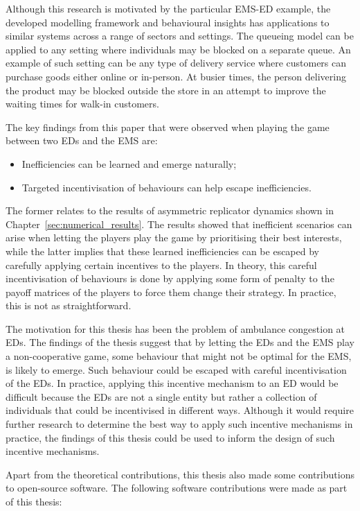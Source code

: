 Although this research is motivated by the particular EMS-ED example, the
developed modelling framework and behavioural insights has applications to
similar systems across a range of sectors and settings.
The queueing model can be applied to any setting where individuals may be
blocked on a separate queue.
An example of such setting can be any type of delivery service where customers
can purchase goods either online or in-person.
At busier times, the person delivering the product may be blocked outside the
store in an attempt to improve the waiting times for walk-in customers.


The key findings from this paper that were observed when playing the game
between two EDs and the EMS are:

\begin{itemize}
    \item Inefficiencies can be learned and emerge naturally;
    \item Targeted incentivisation of behaviours can help escape inefficiencies.
\end{itemize}

The former relates to the results of asymmetric replicator dynamics shown
in Chapter~\ref{sec:numerical_results}.
The results showed that inefficient scenarios can arise when letting the players
play the game by prioritising their best interests, while the latter
implies that these learned inefficiencies can be escaped by carefully applying
certain incentives to the players.
In theory, this careful incentivisation of behaviours is done by applying some
form of penalty to the payoff matrices of the players to force them change
their strategy.
In practice, this is not as straightforward.

The motivation for this thesis has been the problem of ambulance congestion
at EDs. 
The findings of the thesis suggest that by letting the EDs and the EMS play a
non-cooperative game, some behaviour that might not be optimal for the EMS, is
likely to emerge.
Such behaviour could be escaped with careful incentivisation of the EDs.
In practice, applying this incentive mechanism to an ED would be difficult
because the EDs are not a single entity but rather a collection of individuals
that could be incentivised in different ways.
Although it would require further research to determine the best way to
apply such incentive mechanisms in practice, the findings of this thesis
could be used to inform the design of such incentive mechanisms.

Apart from the theoretical contributions, this thesis also made some
contributions to open-source software.
The following software contributions were made as part of this thesis:

